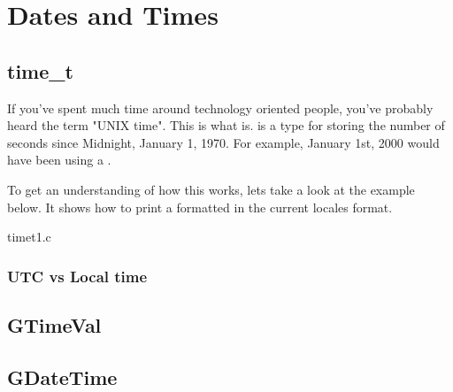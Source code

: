 \chapter{Dates and Times}

\section{time\_t}

If you've spent much time around technology oriented people, you've probably
heard the term "UNIX time". This is what  is. 
is a type for storing the number of seconds since Midnight, January 1, 1970.
For example, January 1st, 2000 would have been  using a
.

To get an understanding of how this works, lets take a look at the example
below. It shows how to print a formatted  in the current
locales format.

\begin{code}{timet1.c}

\end{code}


\subsection{UTC vs Local time}

\section{GTimeVal}

\section{GDateTime}
